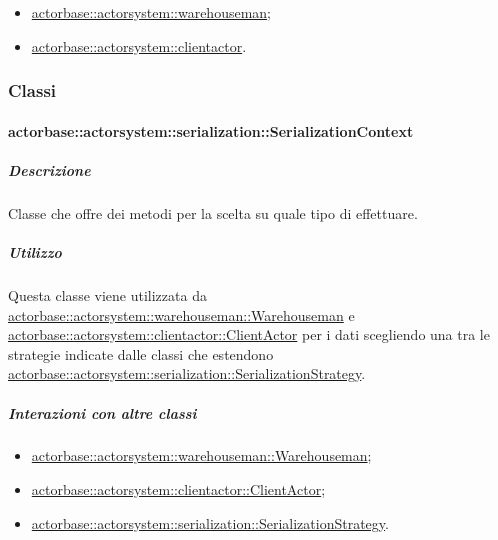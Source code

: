 \documentclass{scalatekids-article}
\begin{document}
\begin{itemize}

\item \hyperref[sec:actorbase::actorsystem::warehouseman]{actorbase::actorsystem::warehouseman};
\item \hyperref[sec:actorbase::actorsystem::clientactor]{actorbase::actorsystem::clientactor}.

\end{itemize}

\subsubsection{Classi}

\paragraph{actorbase::actorsystem::serialization::SerializationContext}
\label{sec:actorbase::actorsystem::serialization::SerializationContext}

\subparagraph{Descrizione}

Classe che offre dei metodi per la scelta su quale tipo di 
effettuare.

\subparagraph{Utilizzo}

Questa classe viene utilizzata da \hyperref[sec:actorbase::actorsystem::warehouseman::Warehouseman]{actorbase::\allowbreak{}actorsystem::\allowbreak{}warehouseman::\allowbreak{}Warehouseman}
e \hyperref[sec:actorbase::actorsystem::clientactor::ClientActor]{actorbase::\allowbreak{}actorsystem::\allowbreak{}clientactor::\allowbreak{}ClientActor}
per  i dati scegliendo una tra le strategie indicate
dalle classi che estendono \hyperref[sec:actorbase::actorsystem::serialization::SerializationStrategy]{actorbase::\allowbreak{}actorsystem::\allowbreak{}serialization::\allowbreak{}SerializationStrategy}.

\subparagraph{Interazioni con altre classi}

\begin{itemize}

\item \hyperref[sec:actorbase::actorsystem::warehouseman::Warehouseman]{actorbase::actorsystem::warehouseman::Warehouseman};
\item \hyperref[sec:actorbase::actorsystem::clientactor::ClientActor]{actorbase::actorsystem::clientactor::ClientActor};
\item \hyperref[sec:actorbase::actorsystem::serialization::SerializationStrategy]{actorbase::actorsystem::serialization::SerializationStrategy}.

\end{itemize}
\end{document}
